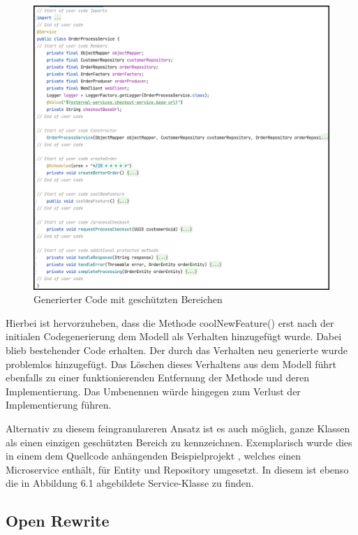 \begin{figure}[ht]
\centering
\includegraphics[width=\textwidth]{bilder/gen/1_light.png}
\caption{Generierter Code mit geschützten Bereichen}
\end{figure}

\newpage

Hierbei ist hervorzuheben, dass die Methode \glqq coolNewFeature()\grqq{} erst nach der initialen Codegenerierung dem Modell als Verhalten hinzugefügt wurde. Dabei blieb bestehender Code erhalten. Der durch das Verhalten neu generierte wurde problemlos hinzugefügt.
Das Löschen dieses Verhaltens aus dem Modell führt ebenfalls zu einer funktionierenden Entfernung der Methode und deren Implementierung. Das Umbenennen würde hingegen zum Verlust der Implementierung führen.

Alternativ zu diesem feingranulareren Ansatz ist es auch möglich, ganze Klassen als einen einzigen geschützten Bereich zu kennzeichnen. Exemplarisch wurde dies in einem dem Quellcode anhängenden Beispielprojekt \cite{bspprojekt}, welches einen Microservice enthält, für Entity und Repository umgesetzt. In diesem ist ebenso die in Abbildung 6.1 abgebildete Service-Klasse zu finden.

\subsection{Open Rewrite}


